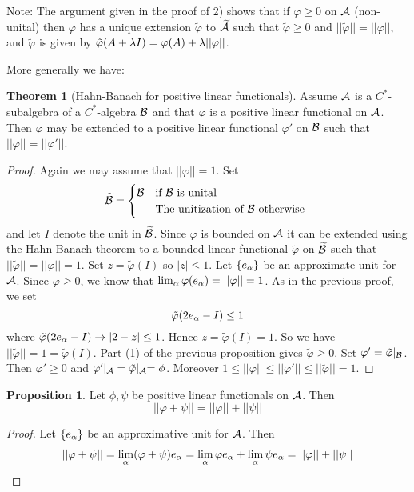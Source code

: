 \documentclass[10pt,english,a4paper]{article}
\theoremstyle{definition}
\newtheorem*{theorem}{Theorem}
\newtheorem*{proposition}{Proposition}
\def\tAs{\widetilde{\As}}
\def\tBs{\widetilde{\Bs}}
\def\tvphi{\tilde{\varphi}}
\def\vphi{\varphi}
\begin{document}
Note:
The argument given in the proof of 2) shows that if $\varphi \geq 0$ on $\mathcal{A}$ 
(non-unital) then $\varphi$ has a unique extension $\tvphi$ to $\tAs$ such that 
$\tvphi\geq 0$ and $||\tvphi|| = ||\vphi||$, and $\tvphi$ is given by
$\tvphi(A + \la I) = \vphi(A) + \la ||\vphi||$. 

More generally we have:  

\begin{theorem}[Hahn-Banach for positive linear functionals]
   Assume $\mathcal{A}$ is a $C^*$-subalgebra of a $C^*$-algebra $\mathcal{B}$ and that 
$\vphi$ is a positive linear functional on $\mathcal{A}$. Then $\varphi$ may be 
extended to a positive linear functional $\vphi'$ on $\mathcal{B}$ such that 
$||\vphi|| = ||\vphi'||$.
\end{theorem}

\begin{proof}
    Again we may assume that $||\vphi||=1$. Set 
\[ \widetilde{\mathcal{B}} = \begin{cases} \mathcal{B} &\text{if $\mathcal{B}$ is unital}\\ &\text{The unitization of $\mathcal{B}$ otherwise } \end{cases}\]
and let $I$ denote the unit in $\tBs$.
Since $\vphi$ is bounded on $\mathcal{A}$ it can be extended using the Hahn-Banach theorem 
to a bounded linear functional $\tvphi$ on $\tBs$ such that $||\tvphi|| =
||\vphi|| = 1$. Set $z = \tvphi(I)$ so $|z| \leq 1$. Let $\{e_{\alpha}\}$ be an 
approximate unit for $\mathcal{A}$. Since $\vphi \geq 0$, we know that $\lim_{\al} \vphi(e_{\al}) = ||\vphi|| = 1$. As in the previous proof, we set 
\[\tvphi(2e_{\al} - I) \leq 1\]
where $\tvphi(2e_{\al} - I) \to |2-z|\leq 1 $. Hence 
$z = \tvphi(I) = 1$. So we have $||\tvphi|| = 1 = \tvphi(I)$. Part (1) of the previous proposition
gives $\tvphi\geq 0$.
Set $\vphi' = \tvphi\lvert_{\Bs}$. Then $\vphi'\geq 0$ and 
$\vphi'\vert_{\As} = \tvphi\lvert_{\As}  = \phi$. Moreover 
$1 \leq ||\vphi|| \leq ||\vphi'|| \leq ||\tvphi|| =1$.
\end{proof}

\begin{proposition}
    Let $\phi, \psi$ be positive linear functionals on $\mathcal{A}$. Then 
    \[ ||\vphi +\psi || = ||\vphi|| + ||\psi|| \]
\end{proposition}
\begin{proof}
    Let $\{e_{\alpha}\}$ be an approximative unit for $\mathcal{A}$. Then 
    \begin{align*}
        ||\vphi +\psi|| = \lim_{\al} (\vphi+\psi)e_{\al} = \lim_{\al}\vphi e_{\al}
        + \lim_{\al} \psi e_{\al} = ||\vphi ||+||\psi||
    \end{align*}    
\end{proof}
\end{document}
